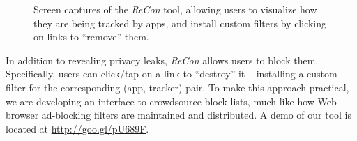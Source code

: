 \begin{figure}[tb]
\hspace{0.1in}
\caption{Screen captures of the \emph{ReCon} tool, allowing users to visualize how they are being tracked by apps, and install custom filters by clicking on links to ``remove'' them. }
\label{fig:recon}
\vspace{\postfigspace}
\end{figure}

In addition to revealing privacy leaks, \emph{ReCon} allows users to block them. Specifically, users can 
click/tap on a link to ``destroy'' it -- installing a custom 
filter for the corresponding (app, tracker) pair. To make this approach practical, we are developing 
an interface to crowdsource block lists, much like how Web browser ad-blocking filters are maintained 
and distributed. A demo of our tool is located at \url{http://goo.gl/pU689F}. 

